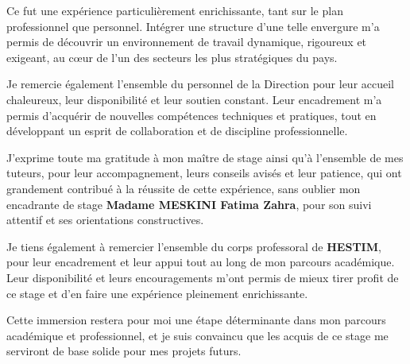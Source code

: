 \documentclass[12pt,a4paper]{article}
\begin{document}
\vspace{0.4cm}

Ce fut une expérience particulièrement enrichissante, tant sur le plan professionnel que personnel. Intégrer une structure d’une telle envergure m’a permis de découvrir un environnement de travail dynamique, rigoureux et exigeant, au cœur de l’un des secteurs les plus stratégiques du pays.

\vspace{0.4cm}

Je remercie également l’ensemble du personnel de la Direction pour leur accueil chaleureux, leur disponibilité et leur soutien constant. Leur encadrement m’a permis d’acquérir de nouvelles compétences techniques et pratiques, tout en développant un esprit de collaboration et de discipline professionnelle.

\vspace{0.4cm}

J’exprime toute ma gratitude à mon maître de stage ainsi qu’à l’ensemble de mes tuteurs, pour leur accompagnement, leurs conseils avisés et leur patience, qui ont grandement contribué à la réussite de cette expérience, sans oublier mon encadrante de stage \textbf{Madame MESKINI Fatima Zahra}, pour son suivi attentif et ses orientations constructives.

\vspace{0.4cm}

Je tiens également à remercier l’ensemble du corps professoral de \textbf{HESTIM}, pour leur encadrement et leur appui tout au long de mon parcours académique. Leur disponibilité et leurs encouragements m’ont permis de mieux tirer profit de ce stage et d’en faire une expérience pleinement enrichissante.

\vspace{0.4cm}

Cette immersion restera pour moi une étape déterminante dans mon parcours académique et professionnel, et je suis convaincu que les acquis de ce stage me serviront de base solide pour mes projets futurs.

\newpage


\tableofcontents

\clearpage
\end{document}
